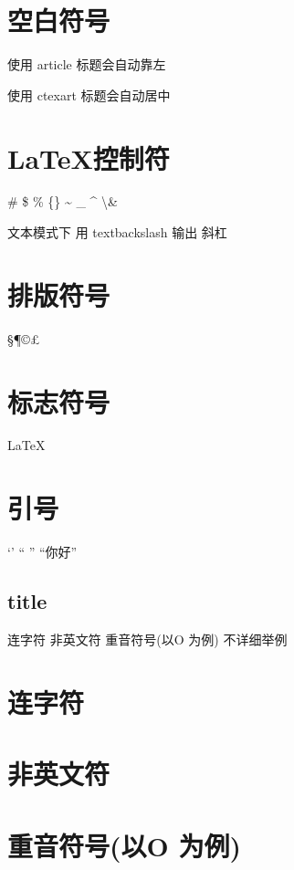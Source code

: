 \documentclass[UTF8]{article}
\date{\today}
\begin{document}
	\section{空白符号}
	使用 article 标题会自动靠左
	
	使用 ctexart 标题会自动居中
		
	\section{\LaTeX 控制符}
	\# \$ \% \{\} \~{}  \_{} \^{} \textbackslash \&
	
	文本模式下 用 textbackslash 输出 斜杠
	
	\section{排版符号}
	\S \P \dag \ddag \copyright \pounds
	\section{ 标志符号}
	 \LaTeX{} \LaTeXe
	
	\XeLaTeX
	\section{引号}
	`'    ``  ''   ``你好'' 
	\subsection{title}
	{连字符}
	{非英文符}
	{重音符号(以O 为例)} 不详细举例
	
	\section{连字符}
	\section{非英文符}
	\section{重音符号(以O 为例)}
\end{document}
